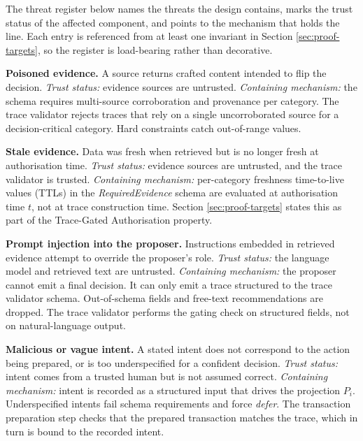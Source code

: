 The threat register below names the threats the design contains, marks the trust status of the affected component, and points to the mechanism that holds the line. Each entry is referenced from at least one invariant in Section \ref{sec:proof-targets}, so the register is load-bearing rather than decorative.

\begin{description}[leftmargin=1.2cm,labelwidth=0.9cm,style=nextline,itemsep=0.85\baselineskip]
\item[\textbf{T1}] \textbf{Poisoned evidence.} A source returns crafted content intended to flip the decision.
\textit{Trust status:} evidence sources are untrusted.
\textit{Containing mechanism:} the schema requires multi-source corroboration and provenance per category. The trace validator rejects traces that rely on a single uncorroborated source for a decision-critical category. Hard constraints catch out-of-range values.

\item[\textbf{T2}] \textbf{Stale evidence.} Data was fresh when retrieved but is no longer fresh at authorisation time.
\textit{Trust status:} evidence sources are untrusted, and the trace validator is trusted.
\textit{Containing mechanism:} per-category freshness time-to-live values (TTLs) in the \textit{RequiredEvidence} schema are evaluated at authorisation time $t$, not at trace construction time. Section \ref{sec:proof-targets} states this as part of the Trace-Gated Authorisation property.

\item[\textbf{T3}] \textbf{Prompt injection into the proposer.} Instructions embedded in retrieved evidence attempt to override the proposer's role.
\textit{Trust status:} the language model and retrieved text are untrusted.
\textit{Containing mechanism:} the proposer cannot emit a final decision. It can only emit a trace structured to the trace validator schema. Out-of-schema fields and free-text recommendations are dropped. The trace validator performs the gating check on structured fields, not on natural-language output.

\item[\textbf{T4}] \textbf{Malicious or vague intent.} A stated intent does not correspond to the action being prepared, or is too underspecified for a confident decision.
\textit{Trust status:} intent comes from a trusted human but is not assumed correct.
\textit{Containing mechanism:} intent is recorded as a structured input that drives the projection $P_i$. Underspecified intents fail schema requirements and force \textit{defer}. The transaction preparation step checks that the prepared transaction matches the trace, which in turn is bound to the recorded intent.


\end{description}
